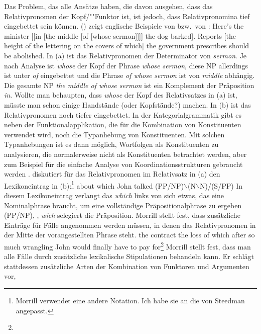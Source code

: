 Das Problem, das alle Ansätze haben, die davon ausgehen, dass das Relativpronomen der
Kopf/""Funktor ist, ist jedoch, dass Relativpronomina tief eingebettet sein können.
() zeigt englische Beispiele von \citet[]{ps2} bzw.\ von \citet[]{Ross67}\nocite{Ross86a-u}:
\eal
\ex Here's the minister [[in [the middle [of [whose sermon]]]] the dog barked].
\ex Reports [the height of the lettering on the covers of which] the government prescribes should be abolished.
\zl
In (a) ist das Relativpronomen der Determinator von \emph{sermon}.
Je nach Analyse ist \emph{whose} der Kopf der Phrase \emph{whose sermon},
diese NP allerdings ist unter \emph{of} eingebettet und die Phrase \emph{of whose sermon}
ist von \emph{middle} abhängig. Die gesamte NP \emph{the middle of whose sermon}
ist ein Komplement der Präposition \emph{in}. Wollte man behaupten, dass \emph{whose}
der Kopf des Relativsatzes in (a) ist, müsste man schon einige Handstände (oder Kopfstände?)
machen. In (b) ist das Relativpronomen noch tiefer eingebettet.
In der Kategorialgrammatik gibt es neben der Funktionalapplikation, die
für die Kombination von Konstituenten verwendet wird, noch die Typanhebung von
Konstituenten. Mit solchen Typanhebungen ist es dann möglich, Wortfolgen als
Konstituenten zu analysieren, die normalerweise nicht als Konstituenten betrachtet
werden, aber zum Beispiel für die einfache Analyse von Koordinationsstrukturen
gebraucht werden \citep{Steedman89a}. \citet[]{Morrill95a} diskutiert für das
Relativpronomen im Relativsatz in (a) den Lexikoneintrag in (b):\footnote{
  Morrill verwendet eine andere Notation. Ich habe sie an die von Steedman angepasst.
}
\eal
\ex about which John talked
\ex (PP/NP)$\backslash$(N$\backslash$N)/(S/PP)
\zl
In diesem Lexikoneintrag verlangt das \emph{which} links von sich etwas, das eine Nominalphrase
braucht, um eine vollständige Präpositionalphrase zu ergeben (PP/NP), \dash, \emph{wich} selegiert die
Präposition. Morrill stellt fest, dass zusätzliche Einträge für Fälle angenommen werden müssen, in
denen das Relativpronomen in der Mitte der vorangestellten Phrase steht.
\ea
the contract the loss of which after so much wrangling John would finally have to pay for\footnote{
}
\z
Morrill stellt fest, dass man alle Fälle durch zusätzliche lexikalische Stipulationen behandeln
kann. Er schlägt stattdessen zusätzliche Arten der Kombination von Funktoren und Argumenten vor,
